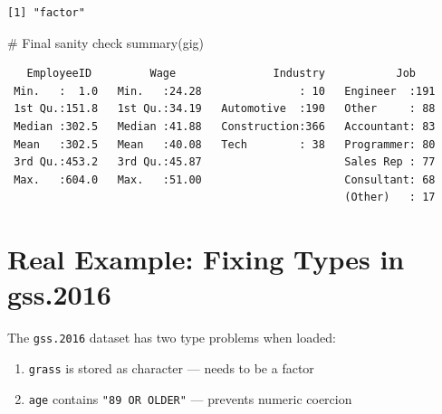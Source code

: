 \documentclass[
  letterpaper,
  DIV=11,
  numbers=noendperiod]{scrreprt}
\newenvironment{Shaded}{\begin{snugshade}}{\end{snugshade}}
\newcommand{\CommentTok}[1]{\textcolor[rgb]{0.37,0.37,0.37}{#1}}
\newcommand{\DocumentationTok}[1]{\textcolor[rgb]{0.37,0.37,0.37}{\textit{#1}}}
\newcommand{\FloatTok}[1]{\textcolor[rgb]{0.68,0.00,0.00}{#1}}
\newcommand{\FunctionTok}[1]{\textcolor[rgb]{0.28,0.35,0.67}{#1}}
\newcommand{\NormalTok}[1]{\textcolor[rgb]{0.00,0.23,0.31}{#1}}
\newcommand{\OtherTok}[1]{\textcolor[rgb]{0.00,0.23,0.31}{#1}}
\newcommand{\SpecialCharTok}[1]{\textcolor[rgb]{0.37,0.37,0.37}{#1}}
\newcommand{\StringTok}[1]{\textcolor[rgb]{0.13,0.47,0.30}{#1}}
\providecommand{\tightlist}{%
  \setlength{\itemsep}{0pt}\setlength{\parskip}{0pt}}\usepackage{longtable,booktabs,array}
\begin{document}
\begin{Shaded}
\end{Shaded}

\begin{verbatim}
[1] "factor"
\end{verbatim}

\begin{Shaded}
\begin{Highlighting}[]
\CommentTok{\# Final sanity check}
\FunctionTok{summary}\NormalTok{(gig)}
\end{Highlighting}
\end{Shaded}

\begin{verbatim}
   EmployeeID         Wage               Industry           Job     
 Min.   :  1.0   Min.   :24.28               : 10   Engineer  :191  
 1st Qu.:151.8   1st Qu.:34.19   Automotive  :190   Other     : 88  
 Median :302.5   Median :41.88   Construction:366   Accountant: 83  
 Mean   :302.5   Mean   :40.08   Tech        : 38   Programmer: 80  
 3rd Qu.:453.2   3rd Qu.:45.87                      Sales Rep : 77  
 Max.   :604.0   Max.   :51.00                      Consultant: 68  
                                                    (Other)   : 17  
\end{verbatim}

\section{Real Example: Fixing Types in
gss.2016}\label{real-example-fixing-types-in-gss.2016}

The \texttt{gss.2016} dataset has two type problems when loaded:

\begin{enumerate}
\def\labelenumi{\arabic{enumi}.}
\tightlist
\item
  \texttt{grass} is stored as character --- needs to be a factor
\item
  \texttt{age} contains \texttt{"89\ OR\ OLDER"} --- prevents numeric
  coercion
\end{enumerate}

\begin{Shaded}
\end{Shaded}
\end{document}
